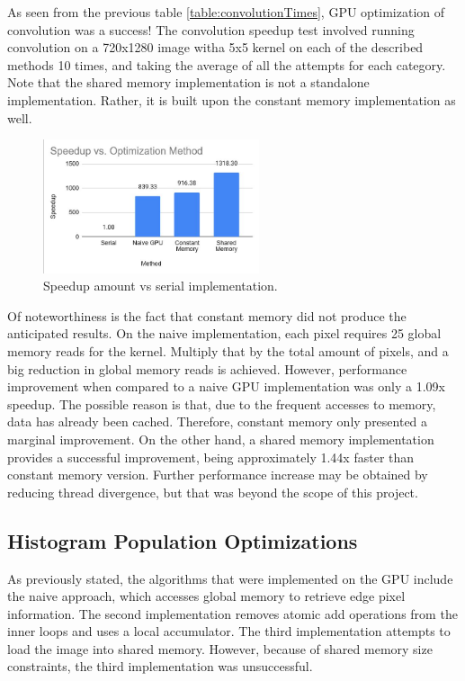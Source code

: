 \documentclass[conference]{IEEEtran}
\begin{document}
As seen from the previous table \autoref{table:convolutionTimes}, GPU optimization of convolution was a success! The convolution speedup test involved running convolution on a 720x1280 image witha 5x5 kernel on each of the described methods 10 times, and taking the average of all the attempts for each category. Note that the shared memory implementation is not a standalone implementation. Rather, it is built upon the constant memory implementation as well. 
\begin{figure}[h]
\centering
\includegraphics[width=2.5in]{images/ConvolutionSpeedup}\caption{Speedup amount vs serial implementation.}\label{figure:convolution-speedup}
\end{figure}
Of noteworthiness is the fact that constant memory did not produce the anticipated results. On the naive implementation, each pixel requires 25 global memory reads for the kernel. Multiply that by the total amount of pixels, and a big reduction in global memory reads is achieved. However, performance improvement when compared to a naive GPU implementation was only a 1.09x speedup. The possible reason is that, due to the frequent accesses to memory, data has already been cached. Therefore, constant memory only presented a marginal improvement. 
On the other hand, a shared memory implementation provides a successful improvement, being approximately 1.44x faster than constant memory version. Further performance increase may be obtained by reducing thread divergence, but that was beyond the scope of this project.

\subsection{Histogram Population Optimizations}
As previously stated, the algorithms that were implemented on the GPU include the naive approach, which accesses global memory to retrieve edge pixel information.
The second implementation removes atomic add operations from the inner loops and uses a local accumulator.
The third implementation attempts to load the image into shared memory. However, because of shared memory size constraints, the third implementation was unsuccessful.
\end{document}
